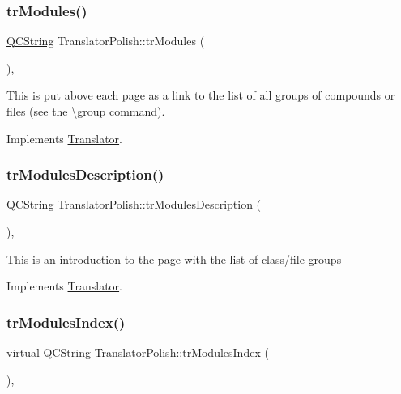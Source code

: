 \subsubsection{\texorpdfstring{trModules()}{trModules()}}
{\footnotesize\ttfamily \mbox{\hyperlink{class_q_c_string}{Q\+C\+String}} Translator\+Polish\+::tr\+Modules (\begin{DoxyParamCaption}{ }\end{DoxyParamCaption})\hspace{0.3cm}{\ttfamily [inline]}, {\ttfamily [virtual]}}

This is put above each page as a link to the list of all groups of compounds or files (see the \textbackslash{}group command). 

Implements \mbox{\hyperlink{class_translator}{Translator}}.

\mbox{\label{class_translator_polish_af2cf868d7d5aa618ce1ddf5dca6c42b6}} 
\subsubsection{\texorpdfstring{trModulesDescription()}{trModulesDescription()}}
{\footnotesize\ttfamily \mbox{\hyperlink{class_q_c_string}{Q\+C\+String}} Translator\+Polish\+::tr\+Modules\+Description (\begin{DoxyParamCaption}{ }\end{DoxyParamCaption})\hspace{0.3cm}{\ttfamily [inline]}, {\ttfamily [virtual]}}

This is an introduction to the page with the list of class/file groups 

Implements \mbox{\hyperlink{class_translator}{Translator}}.

\mbox{\label{class_translator_polish_ae16f884f1db65a68a7d20b0d9be0ab77}} 
\subsubsection{\texorpdfstring{trModulesIndex()}{trModulesIndex()}}
{\footnotesize\ttfamily virtual \mbox{\hyperlink{class_q_c_string}{Q\+C\+String}} Translator\+Polish\+::tr\+Modules\+Index (\begin{DoxyParamCaption}{ }\end{DoxyParamCaption})\hspace{0.3cm}{\ttfamily [inline]}, {\ttfamily [virtual]}}

